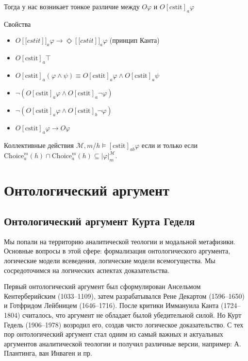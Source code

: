 \documentclass[openany]{book}
\theoremstyle{plain}
\theoremstyle{definition}
\begin{document}
Тогда у нас возникает тонкое различие между \(O \varphi\) и \(O [\mathrm{cstit}]_a \varphi\)

Свойства
\begin{itemize}
\item \(O [\mathrm[cstit]]_a \varphi \to \Diamond [\mathrm[cstit]]_a \varphi\) (принцип Канта)
\item \(O [\mathrm{cstit}]_a \top\) 
\item \(O [\mathrm{cstit}]_a (\varphi \land \psi) \equiv O [\mathrm{cstit}]_a \varphi \land O [\mathrm{cstit}]_a \psi\)
\item \(\neg (O [\mathrm{cstit}]_a \varphi \land O [\mathrm{cstit}]_a \neg \varphi)\)
\item \(\neg (O [\mathrm{cstit}]_a \varphi \land O [\mathrm{cstit}]_b \neg \varphi)\)
\item \(O [\mathrm{cstit}]_a \varphi \to O \varphi\)
\end{itemize}

Коллективные действия \(\mathcal{M}, m/h \models [\mathrm{cstit}]_{ab} \varphi\) если и только если \(\mathrm{Choice}_a^m (h) \cap \mathrm{Choice}_a^m (h) \subseteq |\varphi|_m^{\mathcal{M}}\).


\chapter{Онтологический аргумент}

\section{Онтологический аргумент Курта Геделя}

Мы попали на территорию аналитической теологии и модальной метафизики. Основные вопросы в этой сфере: формализация онтологического аргумента, логические модели всеведения, логические модели всемогущества.
Мы сосредоточимся на логических аспектах доказательства.

Первый онтологический аргумент был сформулирован Ансельмом Кентерберийским (1033--1109), затем разрабатывался Рене Декартом (1596--1650) и Готфридом Лейбницем (1646--1716). После критики Иммануила Канта (1724--1804) считалось, что аргумент не обладает былой убедительной силой. Но Курт Гедель (1906--1978) возродил его, создав чисто логическое доказательство. С тех пор онтологический аргумент стал одним из самый важных и актуальных аргументов аналитической теологии и получил различные версии, например: А. Плантинга, ван Инваген и пр.
\end{document}
